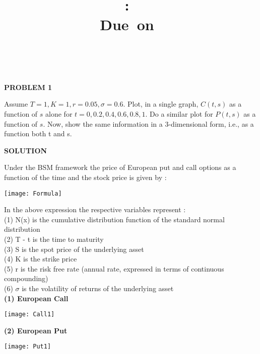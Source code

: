 \documentclass{article}
\title{
\vspace{2in}
\textmd{\textbf{\hmwkClass:\ \hmwkTitle}}\\
\normalsize\vspace{0.1in}\small{Due\ on\ \hmwkDueDate}\\
\vspace{0.1in}\large{\textit{\hmwkClassInstructor\ \hmwkClassTime}}
\vspace{3in}
}
\author{\textbf{\hmwkAuthorName}}
\date{} %
\begin{document}
\maketitle



\newpage

\begin{center}
\textbf{PROBLEM 1}
\end{center}
Assume $T = 1, K = 1, r = 0.05, \sigma = 0.6$. Plot, in a single graph, $C(t, s)$ as a function of $s$ alone for
$t = 0, 0.2, 0.4, 0.6, 0.8, 1$. Do a similar plot for $P(t, s)$ as a function of $s$. Now, show the same information in a
3-dimensional form, i.e., as a function both t and s.

\begin{center}
\textbf{SOLUTION}
\end{center}

Under the BSM framework the price of European put and call options as a function of the time and the stock price is given by :
\begin{center}
\texttt{[image: Formula]}
\end{center}
In the above expression the respective variables represent :\\
(1) N(x) is the cumulative distribution function of the standard normal distribution\\
(2) T - t is the time to maturity\\
(3) S is the spot price of the underlying asset\\
(4) K is the strike price\\
(5) r is the risk free rate (annual rate, expressed in terms of continuous compounding)\\
(6) $\sigma$ is the volatility of returns of the underlying asset\\

\textbf{(1) European Call}
\begin{center}
\texttt{[image: Call1]}
\end{center}

\textbf{(2) European Put}
\begin{center}
\texttt{[image: Put1]}
\end{center}
\end{document}

